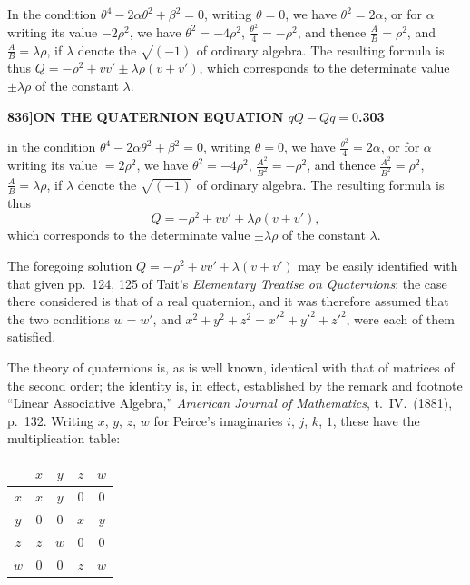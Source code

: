 \documentclass[11pt,a4paper]{book}
\begin{document}
In the condition $\theta^4 - 2\alpha\theta^2 + \beta^2 = 0$, writing $\theta = 0$, we have $\theta^2 = 2\alpha$, or for $\alpha$ writing its value $-2\rho^2$, we have $\theta^2 = -4\rho^2$, $\frac{\theta^2}{4} = -\rho^2$, and thence $\frac{A}{B} = \rho^2$, and $\frac{A}{B} = \lambda\rho$, if $\lambda$ denote the $\sqrt{(-1)}$ of ordinary algebra. The resulting formula is thus $Q = -\rho^2 + vv' \pm \lambda\rho(v + v')$, which corresponds to the determinate value $\pm\lambda\rho$ of the constant $\lambda$.

\newpage
\setcounter{page}{303}

\noindent\textbf{836]}\hfill\textbf{ON THE QUATERNION EQUATION $qQ - Qq = 0$.}\hfill\textbf{303}

\bigskip

\noindent in the condition $\theta^4 - 2\alpha\theta^2 + \beta^2 = 0$, writing $\theta = 0$, we have $\frac{\theta^2}{4} = 2\alpha$, or for $\alpha$ writing its value $= 2\rho^2$, we have $\theta^2 = -4\rho^2$, $\frac{A^2}{B^2} = -\rho^2$, and thence $\frac{A^2}{B^2} = \rho^2$, $\frac{A}{B} = \lambda\rho$, if $\lambda$ denote the $\sqrt{(-1)}$ of ordinary algebra. The resulting formula is thus
\[
Q = -\rho^2 + vv' \pm \lambda\rho(v + v'),
\]
which corresponds to the determinate value $\pm\lambda\rho$ of the constant $\lambda$.

The foregoing solution $Q = -\rho^2 + vv' + \lambda(v + v')$ may be easily identified with that given pp.\ 124, 125 of Tait's \textit{Elementary Treatise on Quaternions}; the case there considered is that of a real quaternion, and it was therefore assumed that the two conditions $w = w'$, and $x^2 + y^2 + z^2 = x'^2 + y'^2 + z'^2$, were each of them satisfied.

The theory of quaternions is, as is well known, identical with that of matrices of the second order; the identity is, in effect, established by the remark and footnote ``Linear Associative Algebra,'' \textit{American Journal of Mathematics}, t.\ IV.\ (1881), p.\ 132. Writing $x$, $y$, $z$, $w$ for Peirce's imaginaries $i$, $j$, $k$, $1$, these have the multiplication table:

\medskip
\begin{center}
\begin{tabular}{c|cccc}
 & $x$ & $y$ & $z$ & $w$ \\
\hline
$x$ & $x$ & $y$ & $0$ & $0$ \\
$y$ & $0$ & $0$ & $x$ & $y$ \\
$z$ & $z$ & $w$ & $0$ & $0$ \\
$w$ & $0$ & $0$ & $z$ & $w$
\end{tabular}
\end{center}
\medskip
\end{document}
